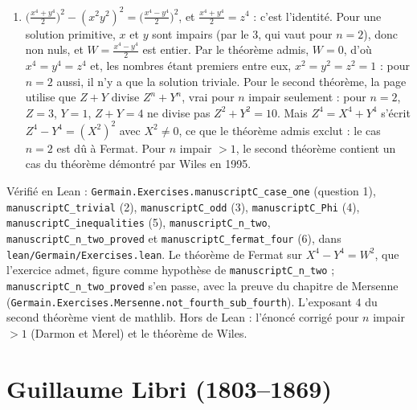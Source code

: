 \documentclass[11pt,a4paper]{article}
\begin{document}
\begin{solution}
\begin{enumerate}
  $(x+y)^2 = 100 < y^2 = 289$ : la seconde inégalité tombe. Pour $x = 7$, $y = 17$,
  autre solution de $x^2 + y^2 = 2\cdot13^2$ : $480 < (x+y)^2 = 576$, c'est la première
  qui tombe. La chaîne ne conclut que si $x$ et $y$ sont de même signe et
  $|y| > 3|x|$ : c'est une deuxième lacune ; l'oubli de la solution triviale (2) en
  est une troisième, et la lecture modernisée en relève une quatrième (deux valeurs
  d'un même produit, l'une par signe, supposées divisibles ensemble par le même
  nombre).
\item $\bigl(\frac{x^4+y^4}{2}\bigr)^2 - (x^2y^2)^2 = \bigl(\frac{x^4-y^4}{2}\bigr)^2$,
  et $\frac{x^4+y^4}{2} = z^4$ : c'est l'identité. Pour une solution primitive, $x$ et
  $y$ sont impairs (par le 3, qui vaut pour $n = 2$), donc non nuls, et
  $W = \frac{x^4-y^4}{2}$ est entier. Par le théorème admis, $W = 0$, d'où
  $x^4 = y^4 = z^4$ et, les nombres étant premiers entre eux, $x^2 = y^2 = z^2 = 1$ :
  pour $n = 2$ aussi, il n'y a que la solution triviale. Pour le second théorème, la
  page utilise que $Z + Y$ divise $Z^n + Y^n$, vrai pour $n$ impair seulement : pour
  $n = 2$, $Z = 3$, $Y = 1$, $Z + Y = 4$ ne divise pas $Z^2 + Y^2 = 10$. Mais
  $Z^4 = X^4 + Y^4$ s'écrit $Z^4 - Y^4 = (X^2)^2$ avec $X^2 \neq 0$, ce que le théorème
  admis exclut : le cas $n = 2$ est dû à Fermat. Pour $n$ impair $> 1$, le second
  théorème contient un cas du théorème démontré par Wiles en 1995.
\end{enumerate}

Vérifié en Lean : \texttt{Germain.Exercises.manuscriptC\_case\_one} (question 1),
\texttt{manuscriptC\_trivial} (2), \texttt{manuscriptC\_odd} (3),
\texttt{manuscriptC\_Phi} (4), \texttt{manuscriptC\_inequalities} (5),
\texttt{manuscriptC\_n\_two}, \texttt{manuscriptC\_n\_two\_proved} et
\texttt{manuscriptC\_fermat\_four} (6), dans \texttt{lean/Germain/Exercises.lean}. Le théorème de
Fermat sur $X^4 - Y^4 = W^2$, que l'exercice admet, figure comme hypothèse de
\texttt{manuscriptC\_n\_two} ; \texttt{manuscriptC\_n\_two\_proved} s'en passe, avec la preuve
du chapitre de Mersenne (\texttt{Germain.Exercises.Mersenne.not\_fourth\_sub\_fourth}). L'exposant
$4$ du second théorème vient de mathlib. Hors de
Lean : l'énoncé corrigé pour $n$ impair $> 1$ (Darmon et Merel) et le théorème de Wiles.
\end{solution}

\section*{Guillaume Libri (1803--1869)}
\end{document}

